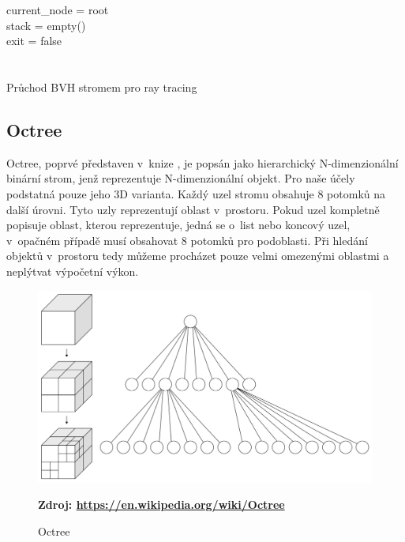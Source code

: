 \begin{center}
	\begin{czechalgorithm}[H] \label{alg:bvh_traverse_naive}
		current\_node = root\\
		stack = empty()\\
		exit = false\\
		 {\\
		}\\
		\caption{Průchod BVH stromem pro ray tracing \cite{Vaidyanathan2019WideBT}}
	\end{czechalgorithm}
\end{center}



\subsection{Octree} \label{octree}
Octree, poprvé představen v~knize \cite{rensselaer1980octree}, je popsán jako hierarchický N-dimenzionální binární strom, jenž reprezentuje N-dimenzionální objekt. Pro naše účely podstatná pouze jeho 3D varianta. Každý uzel stromu obsahuje 8 potomků na další úrovni. Tyto uzly reprezentují oblast v~prostoru. Pokud uzel kompletně popisuje oblast, kterou reprezentuje, jedná se o~list nebo koncový uzel, v~opačném případě musí obsahovat 8 potomků pro podoblasti. Při hledání objektů v~prostoru tedy můžeme procházet pouze velmi omezenými oblastmi a neplýtvat výpočetní výkon.

\begin{figure}[H]
	\centering
	\includegraphics[scale=0.1]{obrazky-figures/Octree2.pdf}
	\caption{Octree}
	\textbf{Zdroj: \url{https://en.wikipedia.org/wiki/Octree}}
	\label{fig:slabs}
\end{figure}


